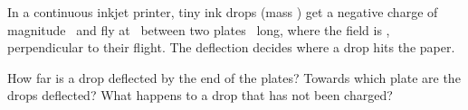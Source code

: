 In a continuous inkjet printer, tiny ink drops (mass \mO) get a negative charge of magnitude \qO\ and fly at \vdO\ between two plates \LpO\ long, where the field is \EO, perpendicular to their flight. The deflection decides where a drop hits the paper.

\begin{abcliste}
\abc How far is a drop deflected by the end of the plates?
\abc Towards which plate are the drops deflected?
\abc What happens to a drop that has not been charged?
\end{abcliste}
